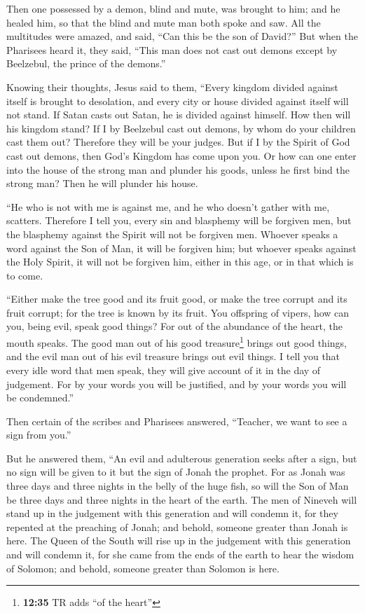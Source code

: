  Then one possessed by a demon, blind and mute, was
brought to him; and he healed him, so that the blind and mute man both
spoke and saw.  All the multitudes were amazed, and said,
``Can this be the son of David?''  But when the Pharisees
heard it, they said, ``This man does not cast out demons except by
Beelzebul, the prince of the demons.''

 Knowing their thoughts, Jesus said to them, ``Every
kingdom divided against itself is brought to desolation, and every city
or house divided against itself will not stand.  If Satan
casts out Satan, he is divided against himself. How then will his
kingdom stand?  If I by Beelzebul cast out demons, by
whom do your children cast them out? Therefore they will be your judges.
 But if I by the Spirit of God cast out demons, then
God's Kingdom has come upon you.  Or how can one enter
into the house of the strong man and plunder his goods, unless he first
bind the strong man? Then he will plunder his house.

 ``He who is not with me is against me, and he who
doesn't gather with me, scatters.  Therefore I tell you,
every sin and blasphemy will be forgiven men, but the blasphemy against
the Spirit will not be forgiven men.  Whoever speaks a
word against the Son of Man, it will be forgiven him; but whoever speaks
against the Holy Spirit, it will not be forgiven him, either in this
age, or in that which is to come.

 ``Either make the tree good and its fruit good, or make
the tree corrupt and its fruit corrupt; for the tree is known by its
fruit.  You offspring of vipers, how can you, being evil,
speak good things? For out of the abundance of the heart, the mouth
speaks.  The good man out of his good treasure\footnote{\textbf{12:35}
  TR adds ``of the heart''} brings out good things, and the evil man out
of his evil treasure brings out evil things.  I tell you
that every idle word that men speak, they will give account of it in the
day of judgement.  For by your words you will be
justified, and by your words you will be condemned.''

 Then certain of the scribes and Pharisees answered,
``Teacher, we want to see a sign from you.''

 But he answered them, ``An evil and adulterous
generation seeks after a sign, but no sign will be given to it but the
sign of Jonah the prophet.  For as Jonah was three days
and three nights in the belly of the huge fish, so will the Son of Man
be three days and three nights in the heart of the earth.
 The men of Nineveh will stand up in the judgement with
this generation and will condemn it, for they repented at the preaching
of Jonah; and behold, someone greater than Jonah is here.
 The Queen of the South will rise up in the judgement
with this generation and will condemn it, for she came from the ends of
the earth to hear the wisdom of Solomon; and behold, someone greater
than Solomon is here.

